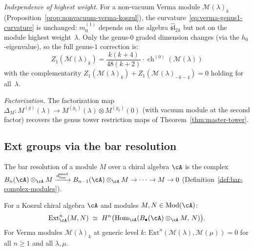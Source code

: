 \begin{example}
\emph{Independence of highest weight.}
For a non-vacuum Verma module $\mathcal{M}(\lambda)_k$
(Proposition~\ref{prop:nonvacuum-verma-koszul}), the
curvature~\eqref{eq:verma-genus1-curvature} is unchanged:
$m_0^{(1)}$ depends on the algebra $\widehat{\mathfrak{sl}}_2{}_k$
but not on the module highest weight~$\lambda$. Only the
genus-$0$ graded dimension changes (via the $h_0$-eigenvalue),
so the full genus-$1$ correction is:
\[
Z_1(\mathcal{M}(\lambda)_k)
= \frac{k(k+4)}{48(k+2)} \cdot \operatorname{ch}^{(0)}(\mathcal{M}(\lambda))
\]
with the complementarity
$Z_1(\mathcal{M}(\lambda)_k) + Z_1(\mathcal{M}(\lambda)_{-k-4}) = 0$
holding for all~$\lambda$.

\emph{Factorization.}
The factorization map
$\Delta_M\colon M^{(g)}(\lambda) \to
M^{(g_1)}(\lambda) \otimes M^{(g_2)}(0)$
(with vacuum module at the second factor) recovers the genus tower
restriction maps of Theorem~\ref{thm:master-tower}.
\end{example}

\subsection{Ext groups via the bar resolution}
\label{subsec:ext-bar-resolution}

The bar resolution of a module $M$ over a chiral algebra $\cA$ is
the complex
$B_n(\cA) \otimes_\cA M \xrightarrow{d^{\mathrm{mod}}_{\mathrm{bar}}}
B_{n-1}(\cA) \otimes_\cA M \to \cdots \to M \to 0$
(Definition~\ref{def:bar-complex-modules}).

\begin{proposition}
\label{prop:ext-bar-resolution}
For a Koszul chiral algebra $\cA$ and modules $M, N \in \mathrm{Mod}(\cA)$:
\begin{equation}\label{eq:ext-bar-resolution}
\mathrm{Ext}^n_\cA(M, N)
\;\simeq\;
H^n\bigl(\mathrm{Hom}_\cA(B_\bullet(\cA) \otimes_\cA M,\, N)\bigr).
\end{equation}
For Verma modules $\mathcal{M}(\lambda)_k$ at generic level $k$:
$\mathrm{Ext}^n(\mathcal{M}(\lambda), \mathcal{M}(\mu)) = 0$
for all $n \geq 1$ and all $\lambda, \mu$.
\end{proposition}


